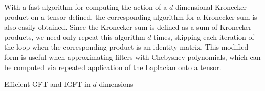 With a fast algorithm for computing the action of a $d$-dimensional Kronecker product on a tensor defined, the corresponding algorithm for a Kronecker sum is also easily obtained. Since the Kronecker sum is defined as a sum of Kronecker products, we need only repeat this algorithm $d$ times, skipping each iteration of the loop when the corresponding product is an identity matrix. This modified form is useful when approximating filters with Chebyshev polynomials, which can be computed via repeated application of the Laplacian onto a tensor. 
 
\newpage


\begin{algorithm}[t]
    \hypertarget{al:GFT_dd}{}
    \caption{Efficient GFT and IGFT in $d$-dimensions}
    \begin{algorithmic}
    \vspace{0.25cm}
    \vspace{0.8cm}
    \vspace{0.25cm}
    \vspace{0.25cm}
    \vspace{0.25cm}
    \vspace{0.25cm}
    \EndFor
    \vspace{0.25cm}
    \vspace{0.25cm}
    \EndFunction
    \vspace{1cm}
    \vspace{0.25cm}
    \vspace{0.25cm}
    \vspace{0.25cm}
    \vspace{0.25cm}
    \EndFor
    \vspace{0.25cm}
    \vspace{0.25cm}
    \EndFunction
    \vspace{0.25cm}
    \end{algorithmic}
    \label{al:GFT_dd}
\end{algorithm}

